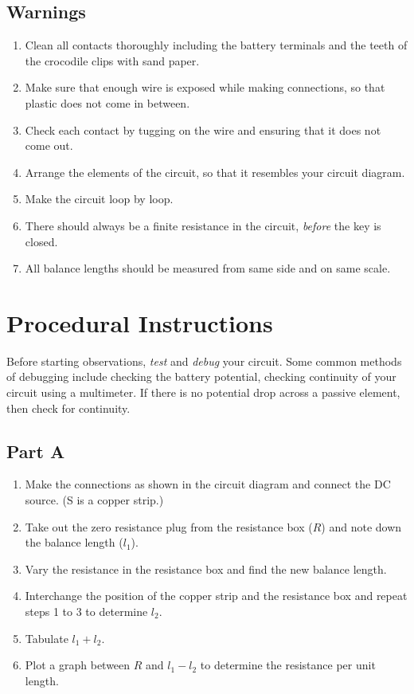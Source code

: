 \subsection*{Warnings}
\begin{enumerate}
    \item Clean all contacts thoroughly including the battery terminals and the teeth of the crocodile clips with sand paper.
    \item Make sure that enough wire is exposed while making connections, so that plastic does not come in between.
    \item Check each contact by tugging on the wire and ensuring that it does not come out.
    \item Arrange the elements of the circuit, so that it resembles your circuit diagram.
    \item Make the circuit loop by loop.
    \item There should always be a finite resistance in the circuit, \textit{before} the key is closed.
    \item All balance lengths should be measured from same side and on same scale.
\end{enumerate}


\section*{Procedural Instructions}

{\color{red}Before starting observations, \textit{test} and \textit{debug} your circuit. Some common methods of debugging include checking the battery potential, checking continuity of your circuit using a multimeter. If there is no potential drop across a passive element, then check for continuity.}


\subsection*{Part A}

\begin{enumerate}
    \item Make the connections as shown in the circuit diagram and connect the DC source. (S is a copper strip.)
    \item Take out the zero resistance plug from the resistance box ($R$) and note down the balance length ($l_1$).
    \item Vary the resistance in the resistance box and find the new balance length.
    \item Interchange the position of the copper strip and the resistance box and repeat steps 1 to 3 to determine $l_2$.
    \item Tabulate $l_1 + l_2$.
    \item Plot a graph between $R$ and $l_1 -l_2$ to determine the resistance per unit length.
\end{enumerate}


